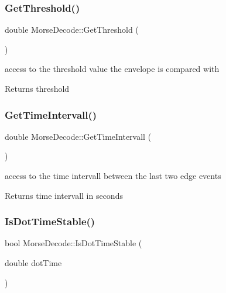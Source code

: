 \subsubsection{\texorpdfstring{Get\+Threshold()}{GetThreshold()}}
{\footnotesize\ttfamily double Morse\+Decode\+::\+Get\+Threshold (\begin{DoxyParamCaption}{ }\end{DoxyParamCaption})}



access to the threshold value the envelope is compared with 

\begin{DoxyReturn}{Returns}
threshold 
\end{DoxyReturn}
\mbox{\label{classMorseDecode_acdc50282bee5f2893d3aeb1210b47ca7}} 
\subsubsection{\texorpdfstring{Get\+Time\+Intervall()}{GetTimeIntervall()}}
{\footnotesize\ttfamily double Morse\+Decode\+::\+Get\+Time\+Intervall (\begin{DoxyParamCaption}{ }\end{DoxyParamCaption})}



access to the time intervall between the last two edge events 

\begin{DoxyReturn}{Returns}
time intervall in seconds 
\end{DoxyReturn}
\mbox{\label{classMorseDecode_af3dc30a7ec25c0eaba9c3e4c08029939}} 
\subsubsection{\texorpdfstring{Is\+Dot\+Time\+Stable()}{IsDotTimeStable()}}
{\footnotesize\ttfamily bool Morse\+Decode\+::\+Is\+Dot\+Time\+Stable (\begin{DoxyParamCaption}\item[{double}]{dot\+Time }\end{DoxyParamCaption})\hspace{0.3cm}{\ttfamily [private]}}



